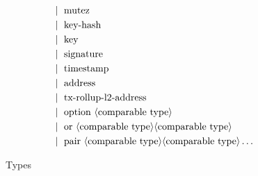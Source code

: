 \documentclass[a4paper,UKenglish,cleveref, autoref, thm-restate]{lipics-v2021}
\begin{document}
\begin{figure} []
\begin{align*}
   &\mid\ \text{mutez}\\
   &\mid\ \text{key-hash}\\
   &\mid\ \text{key}\\
   &\mid\ \text{signature}\\
   &\mid\ \text{timestamp}\\
   &\mid\ \text{address}\\
   &\mid\ \text{tx-rollup-l2-address}\\
   &\mid\ \text{option}\ \langle\text{comparable type}\rangle\\
   &\mid\ \text{or}\ \langle\text{comparable type}\rangle \langle\text{comparable type}\rangle\\
   &\mid\ \text{pair}\ \langle\text{comparable type}\rangle \langle\text{comparable type}\rangle \dots \\
\end{align*}
\caption{Types}
\label{fig:type}
\end{figure}
\end{document}
